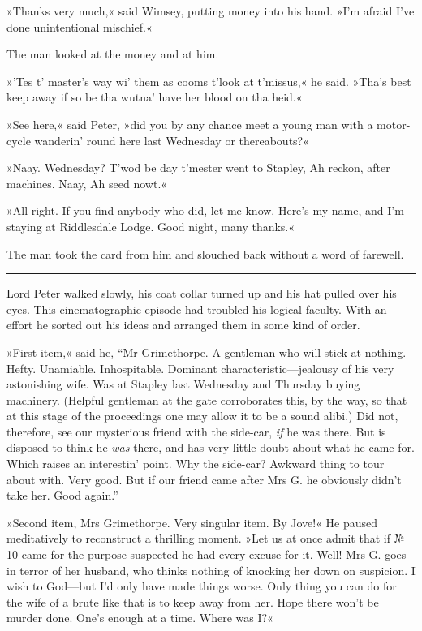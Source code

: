 »Thanks very much,« said Wimsey, putting money into his hand. »I'm afraid I've done unintentional mischief.«

The man looked at the money and at him.

»'Tes t' master's way wi' them as cooms t'look at t'missus,« he said.  »Tha's best keep away if so be tha wutna' have her blood on tha heid.«

»See here,« said Peter, »did you by any chance meet a young man with a motor-cycle wanderin' round here last Wednesday or thereabouts?«

»Naay. Wednesday? T'wod be day t'mester went to Stapley, Ah reckon, after machines. Naay, Ah seed nowt.«

»All right. If you find anybody who did, let me know. Here's my name, and I'm staying at Riddlesdale Lodge. Good night, many thanks.«

The man took the card from him and slouched back without a word of farewell.

\noindent\hfil\rule{0.5\textwidth}{.4pt}\hfil

Lord Peter walked slowly, his coat collar turned up and his hat pulled over his eyes. This cinematographic episode had troubled his logical faculty. With an effort he sorted out his ideas and arranged them in some kind of order.

»First item,« said he, \enquote{Mr Grimethorpe. A gentleman who will stick at nothing. Hefty. Unamiable. Inhospitable. Dominant characteristic\allowbreak---\allowbreak jealousy of his very astonishing wife. Was at Stapley last Wednesday and Thursday buying machinery. (Helpful gentleman at the gate corroborates this, by the way, so that at this stage of the proceedings one may allow it to be a sound alibi.) Did not, therefore, see our mysterious friend with the side-car, \textit{if} he was there. But is disposed to think he \textit{was} there, and has very little doubt about what he came for. Which raises an interestin' point. Why the side-car?  Awkward thing to tour about with. Very good. But if our friend came after Mrs G. he obviously didn't take her. Good again.}

»Second item, Mrs Grimethorpe. Very singular item. By Jove!« He paused meditatively to reconstruct a thrilling moment. »Let us at once admit that if № 10 came for the purpose suspected he had every excuse for it. Well! Mrs G. goes in terror of her husband, who thinks nothing of knocking her down on suspicion. I wish to God\allowbreak---\allowbreak but I'd only have made things worse. Only thing you can do for the wife of a brute like that is to keep away from her. Hope there won't be murder done. One's enough at a time. Where was I?«

